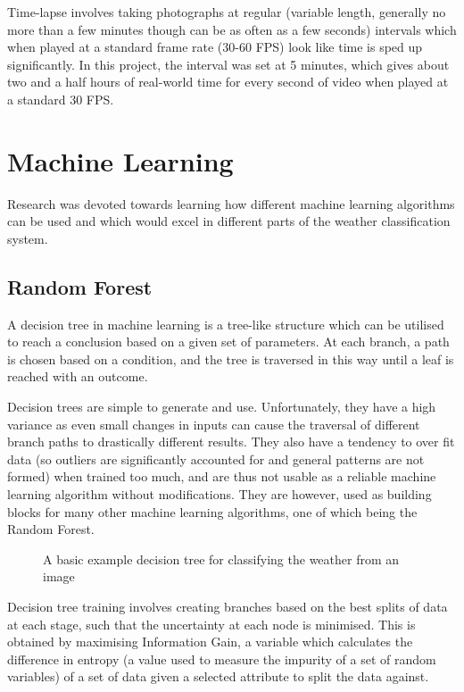 \documentclass[a4paper,12pt,twoside]{report}
\begin{document}
Time-lapse involves taking photographs at regular (variable length, generally no more than a few minutes though can be as often as a few seconds) intervals which when played at a standard frame rate (30-60 FPS) look like time is sped up significantly. In this project, the interval was set at 5 minutes, which gives about two and a half hours of real-world time for every second of video when played at a standard 30 FPS.

\section{Machine Learning}
Research was devoted towards learning how different machine learning algorithms can be used and which would excel in different parts of the weather classification system.

\subsection{Random Forest}
A decision tree in machine learning is a tree-like structure which can be utilised to reach a conclusion based on a given set of parameters. At each branch, a path is chosen based on a condition, and the tree is traversed in this way until a leaf is reached with an outcome. 

Decision trees are simple to generate and use. Unfortunately, they have a high variance as even small changes in inputs can cause the traversal of different branch paths to drastically different results. They also have a tendency to over fit data (so outliers are significantly accounted for and general patterns are not formed) when trained too much, and are thus not usable as a reliable machine learning algorithm without modifications. They are however, used as building blocks for many other machine learning algorithms, one of which being the Random Forest.

\begin{figure}[H]
 \centering
 
 \caption{A basic example decision tree for classifying the weather from an image}
\end{figure}

Decision tree training involves creating branches based on the best splits of data at each stage, such that the uncertainty at each node is minimised. This is obtained by maximising Information Gain, a variable which calculates the difference in entropy (a value used to measure the impurity of a set of random variables) of a set of data given a selected attribute to split the data against.
\end{document}
